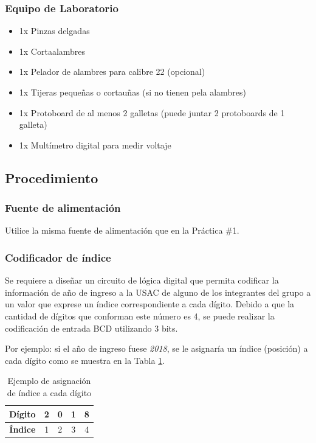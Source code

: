 \subsubsection*{Equipo de Laboratorio}
\begin{itemize}
    \item 1x Pinzas delgadas
    \item 1x Cortaalambres
    \item 1x Pelador de alambres para calibre 22 (opcional)
    \item 1x Tijeras pequeñas o cortauñas (si no tienen pela alambres)
    \item 1x Protoboard de al menos 2 galletas (puede juntar 2 protoboards de 1 galleta)
    \item 1x Multímetro digital para medir voltaje
\end{itemize}

\subsection{Procedimiento}
\subsubsection{Fuente de alimentación}
Utilice la misma fuente de alimentación que en la Práctica \#1.

\subsubsection{Codificador de índice}
Se requiere a diseñar un circuito de lógica digital que permita codificar la información de año de ingreso a la USAC de alguno de los
integrantes del grupo a un valor que exprese un índice correspondiente a cada dígito. Debido a que la cantidad de dígitos
que conforman este número es 4, se puede realizar la codificación de entrada BCD utilizando 3 bits.

\vspace{14pt}

Por ejemplo: si el año de ingreso fuese \emph{2018}, se le asignaría un índice (posición) a cada dígito como se
muestra en la Tabla \ref{Table:ejemploIndices}.

\begin{table}[H]
    \centering
    \begin{tabular}{|c|c|c|c|c|}
        \hline
        \textbf{Dígito} & 2 & 0 & 1 & 8 \\ \hline
        \textbf{Índice}  & 1 & 2 & 3 & 4 \\ \hline
    \end{tabular}
    \caption{Ejemplo de asignación de índice a cada dígito}
    \label{Table:ejemploIndices}
\end{table}


